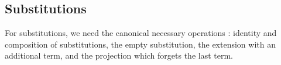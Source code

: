\begin{AgdaAlign}
\subsection{Substitutions}
For substitutions, we need the canonical necessary operations \cite{AltenkirchK16,Chapman09}: identity and composition of
substitutions, the empty substitution, the extension with an additional term, and the projection which forgets the last term.
\begin{code}%
%
\>[2]\AgdaSpace{}%
\AgdaSpace{}%
\AgdaSymbol{:}\AgdaSpace{}%
\AgdaSpace{}%
\AgdaSymbol{\{}\AgdaSymbol{\}}\AgdaSpace{}%
\AgdaSpace{}%
\AgdaSpace{}%
\AgdaSpace{}%
\AgdaSpace{}%
\AgdaSpace{}%
\AgdaSpace{}%
\AgdaSpace{}%
\AgdaSpace{}%
\<%
\\
\>[2][@{}l@{\AgdaIndent{0}}]%
\>[4]\AgdaSpace{}%
\AgdaSymbol{:}\AgdaSpace{}%
\AgdaSpace{}%
\AgdaSymbol{\{}\AgdaSymbol{\}}\AgdaSpace{}%
\AgdaSymbol{(}\AgdaSpace{}%
\AgdaSymbol{:}\AgdaSpace{}%
\AgdaSpace{}%
\AgdaSymbol{)}\AgdaSpace{}%
\AgdaSpace{}%
\AgdaSpace{}%
\AgdaSpace{}%
\<%
\\
%
\>[4]\AgdaSpace{}%
\AgdaSymbol{:}\AgdaSpace{}%
\AgdaSpace{}%
\AgdaSymbol{\{}\AgdaSymbol{\}}\AgdaSpace{}%
\AgdaSymbol{(}\AgdaSpace{}%
\AgdaSymbol{:}\AgdaSpace{}%
\AgdaSpace{}%
\AgdaSymbol{)}\AgdaSpace{}%
\AgdaSpace{}%
\AgdaSpace{}%
\AgdaSpace{}%
\<%
\\
%
\>[4]\AgdaOperator{\AgdaInductiveConstructor{\AgdaUnderscore{},\AgdaUnderscore{}}}\AgdaSpace{}%
\AgdaSymbol{:}\AgdaSpace{}%
\AgdaSpace{}%
\AgdaSymbol{\{}\AgdaSymbol{\}}\AgdaSpace{}%
\AgdaSymbol{\{}\AgdaSpace{}%
\AgdaSpace{}%
\AgdaSymbol{:}\AgdaSpace{}%
\AgdaSpace{}%
\AgdaSymbol{\}}\AgdaSpace{}%
\AgdaSymbol{\{}\AgdaSpace{}%
\AgdaSymbol{:}\AgdaSpace{}%
\AgdaSpace{}%
\AgdaSymbol{\}}\AgdaSpace{}%
\AgdaSpace{}%
\AgdaSpace{}%
\AgdaSpace{}%
\AgdaSpace{}%
\AgdaSpace{}%
\AgdaSpace{}%

\end{code}
\end{AgdaAlign}
